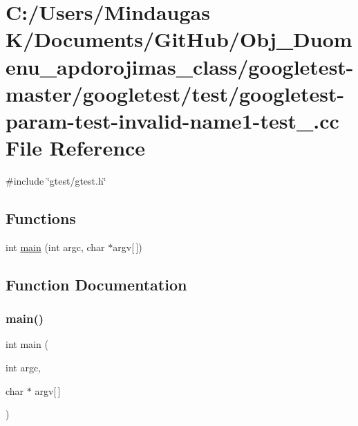 \hypertarget{googletest-master_2googletest_2test_2googletest-param-test-invalid-name1-test___8cc}{}\section{C\+:/\+Users/\+Mindaugas K/\+Documents/\+Git\+Hub/\+Obj\+\_\+\+Duomenu\+\_\+apdorojimas\+\_\+class/googletest-\/master/googletest/test/googletest-\/param-\/test-\/invalid-\/name1-\/test\+\_\+.cc File Reference}
\label{googletest-master_2googletest_2test_2googletest-param-test-invalid-name1-test___8cc}
{\ttfamily \#include \char`\"{}gtest/gtest.\+h\char`\"{}}\newline
\subsection*{Functions}
\begin{DoxyCompactItemize}
\item 
int \mbox{\hyperlink{googletest-master_2googletest_2test_2googletest-param-test-invalid-name1-test___8cc_a0ddf1224851353fc92bfbff6f499fa97}{main}} (int argc, char $\ast$argv\mbox{[}$\,$\mbox{]})
\end{DoxyCompactItemize}


\subsection{Function Documentation}
\mbox{\label{googletest-master_2googletest_2test_2googletest-param-test-invalid-name1-test___8cc_a0ddf1224851353fc92bfbff6f499fa97}} 
\subsubsection{\texorpdfstring{main()}{main()}}
{\footnotesize\ttfamily int main (\begin{DoxyParamCaption}\item[{int}]{argc,  }\item[{char $\ast$}]{argv\mbox{[}$\,$\mbox{]} }\end{DoxyParamCaption})}

